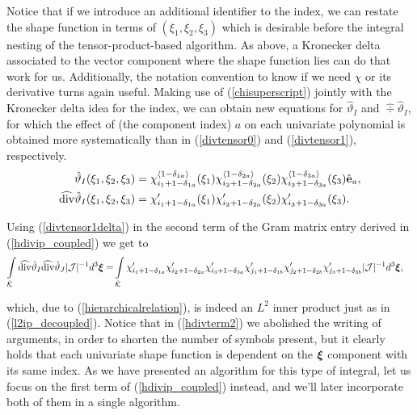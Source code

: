 Notice that if we introduce an additional identifier to the index, we can restate the shape function in terms of $(\xi_1,\xi_2,\xi_3)$ which is desirable before the integral nesting of the tensor-product-based algorithm. As above, a Kronecker delta associated to the vector component where the shape function lies can do that work for us. Additionally, the notation convention to know if we need $\chi$ or its derivative turns again useful. Making use of (\ref{chisuperscript}) jointly with the Kronecker delta idea for the index, we can obtain new equations for $\hat{\vartheta}_I$ and $\widehat{\div}\hat{\vartheta}_I$, for which the effect of (the component index) $a$ on each univariate polynomial is obtained more systematically than in (\ref{divtensor0}) and (\ref{divtensor1}), respectively.
% 
\begin{align}
    \hat{\vartheta}_I(\xi_1,\xi_2,\xi_3)&= \chi_{i_1+1-\delta_{1a}}^{\langle1-\delta_{1a}\rangle}(\xi_1)\chi_{i_2+1-\delta_{2a}}^{\langle1-\delta_{2a}\rangle}(\xi_2) \chi_{i_3+1-\delta_{3a}}^{\langle1-\delta_{3a}\rangle}(\xi_3)\hat{\mathbf{e}}_a,\label{divtensor0delta}\\
    \widehat{\operatorname{div}}\hat{\vartheta}_I(\xi_1,\xi_2,\xi_3)&=\chi_{i_1+1-\delta_{1a}}'(\xi_1)\chi_{i_2+1-\delta_{2a}}'(\xi_2)\chi_{i_3+1-\delta_{3a}}'(\xi_3). \label{divtensor1delta}
\end{align}

Using (\ref{divtensor1delta}) in the second term of the Gram matrix entry derived in (\ref{hdivip_coupled}) we get to
% 
\begin{align}
    \int\limits_{\hat{\mathcal{K}}}\widehat{\operatorname{div}}\hat{\vartheta}_I\widehat{\operatorname{div}}\hat{\vartheta}_J|\mathcal{J}|^{-1}d^3\boldsymbol{\xi}
    =&
        \int\limits_{\hat{\mathcal{K}}}\chi_{i_1+1-\delta_{1a}}'\chi_{i_2+1-\delta_{2a}}'\chi_{i_3+1-\delta_{3a}}' \chi_{j_1+1-\delta_{1b}}'\chi_{j_2+1-\delta_{2b}}'\chi_{j_3+1-\delta_{3b}}'|\mathcal{J}|^{-1}d^3\boldsymbol{\xi},
        \label{hdivterm2}
\end{align}

\noindent which, due to (\ref{hierarchicalrelation}), is indeed an $L^2$ inner product just as in (\ref{l2ip_decoupled}). Notice that in (\ref{hdivterm2}) we abolished the writing of arguments, in order to shorten the number of symbols present, but it clearly holds that each univariate shape function is dependent on the $\boldsymbol{\xi}$ component with its same index. As we have presented an algorithm for this type of integral, let us focus on the first term of (\ref{hdivip_coupled}) instead, and we'll later incorporate both of them in a single algorithm.

